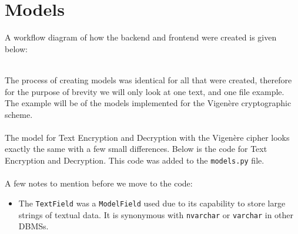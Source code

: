 \documentclass[a4paper, 12pt, titlepage]{report}
\begin{document}
\section{Models}
A workflow diagram of how the backend and frontend were created is given below:\\\\
\begin{center}
\end{center}
The process of creating models was identical for all that were created, therefore for the purpose of brevity we will only look at one text, and one file example. The example will be of the models implemented for the Vigenère cryptographic scheme.\\\\
The model for Text Encryption and Decryption with the Vigenère cipher looks exactly the same with a few small differences. Below is the code for Text Encryption and Decryption. This code was added to the \texttt{models.py} file.\\\\
A few notes to mention before we move to the code:
\begin{itemize}
\item The \texttt{TextField} was a \texttt{ModelField} used due to its capability to store large strings of textual data. It is synonymous with \texttt{nvarchar} or \texttt{varchar} in other DBMSs.
\end{itemize}
\end{document}
